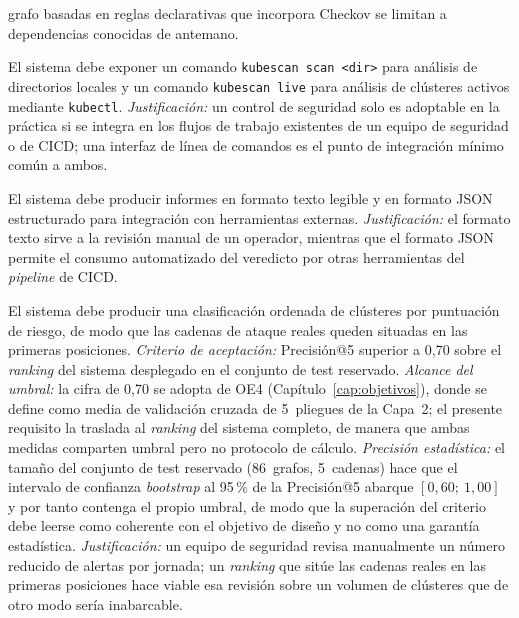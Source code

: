 \begin{description}
    grafo basadas en reglas declarativas que incorpora Checkov se limitan
    a dependencias conocidas de antemano.
  \item[RF-3 — Interfaz de línea de comandos.] El sistema debe exponer un comando
    \texttt{kubescan scan <dir>} para análisis de directorios locales y un comando
    \texttt{kubescan live} para análisis de clústeres activos mediante \texttt{kubectl}.
    \textit{Justificación:} un control de seguridad solo es adoptable en la práctica
    si se integra en los flujos de trabajo existentes de un equipo de seguridad o de
    \acs{CICD}; una interfaz de línea de comandos es el punto de integración mínimo
    común a ambos.
  \item[RF-4 — Formatos de salida.] El sistema debe producir informes en formato texto
    legible y en formato \acs{JSON} estructurado para integración con herramientas externas.
    \textit{Justificación:} el formato texto sirve a la revisión manual de un
    operador, mientras que el formato \acs{JSON} permite el consumo automatizado
    del veredicto por otras herramientas del \textit{pipeline} de \acs{CICD}.
  \item[RF-5 — Priorización de riesgos.] El sistema debe producir una clasificación
    ordenada de clústeres por puntuación de riesgo, de modo que las cadenas de
    ataque reales queden situadas en las primeras posiciones.
    \textit{Criterio de aceptación:} Precisión@5 superior a 0,70 sobre el
    \textit{ranking} del sistema desplegado en el conjunto de test reservado.
    \textit{Alcance del umbral:} la cifra de 0,70 se adopta de OE4
    (Capítulo~\ref{cap:objetivos}), donde se define como media de validación
    cruzada de 5~pliegues de la Capa~2; el presente requisito la traslada al
    \textit{ranking} del sistema completo, de manera que ambas medidas comparten
    umbral pero no protocolo de cálculo.
    \textit{Precisión estadística:} el tamaño del conjunto de test reservado
    (86~grafos, 5~cadenas) hace que el intervalo de confianza \textit{bootstrap}
    al 95\,\% de la Precisión@5 abarque \([0{,}60;\ 1{,}00]\) y por tanto contenga
    el propio umbral, de modo que la superación del criterio debe leerse como
    coherente con el objetivo de diseño y no como una garantía estadística.
    \textit{Justificación:} un equipo de seguridad revisa manualmente un número
    reducido de alertas por jornada; un \textit{ranking} que sitúe las cadenas reales en
    las primeras posiciones hace viable esa revisión sobre un volumen de
    clústeres que de otro modo sería inabarcable.
\end{description}

